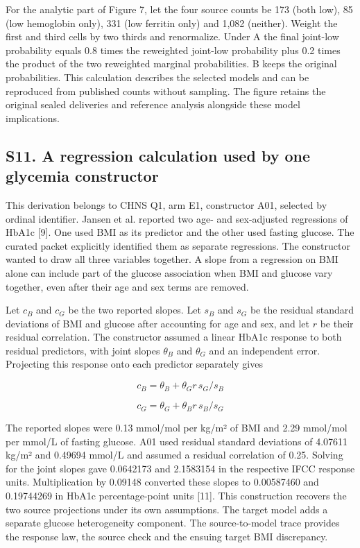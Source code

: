 \documentclass[11pt,letterpaper]{article}
\begin{document}
For the analytic part of Figure 7, let the four source counts be 173 (both low), 85 (low hemoglobin only), 331 (low ferritin only) and 1,082 (neither). Weight the first and third cells by two thirds and renormalize. Under A the final joint-low probability equals 0.8 times the reweighted joint-low probability plus 0.2 times the product of the two reweighted marginal probabilities. B keeps the original probabilities. This calculation describes the selected models and can be reproduced from published counts without sampling. The figure retains the original sealed deliveries and reference analysis alongside these model implications.


\subsection*{S11. A regression calculation used by one glycemia constructor}

This derivation belongs to CHNS Q1, arm E1, constructor A01, selected by ordinal identifier. Jansen et al. reported two age- and sex-adjusted regressions of HbA1c [9]. One used BMI as its predictor and the other used fasting glucose. The curated packet explicitly identified them as separate regressions. The constructor wanted to draw all three variables together. A slope from a regression on BMI alone can include part of the glucose association when BMI and glucose vary together, even after their age and sex terms are removed.


Let \(c_B\) and \(c_G\) be the two reported slopes. Let \(s_B\) and \(s_G\) be the residual standard deviations of BMI and glucose after accounting for age and sex, and let \(r\) be their residual correlation. The constructor assumed a linear HbA1c response to both residual predictors, with joint slopes \(\theta_B\) and \(\theta_G\) and an independent error. Projecting this response onto each predictor separately gives


\[
c_B = \theta_B + \theta_G r\,s_G/s_B
\]

\[
c_G = \theta_G + \theta_B r\,s_B/s_G
\]

The reported slopes were 0.13 mmol/\allowbreak{}mol per kg/\allowbreak{}m² of BMI and 2.29 mmol/\allowbreak{}mol per mmol/\allowbreak{}L of fasting glucose. A01 used residual standard deviations of 4.07611 kg/\allowbreak{}m² and 0.49694 mmol/\allowbreak{}L and assumed a residual correlation of 0.25. Solving for the joint slopes gave 0.0642173 and 2.1583154 in the respective IFCC response units. Multiplication by 0.09148 converted these slopes to 0.00587460 and 0.19744269 in HbA1c percentage-point units [11]. This construction recovers the two source projections under its own assumptions. The target model adds a separate glucose heterogeneity component. The source-to-model trace provides the response law, the source check and the ensuing target BMI discrepancy.
\end{document}
